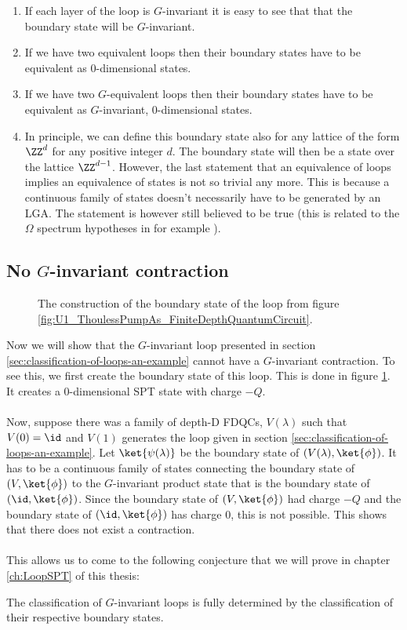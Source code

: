 \begin{enumerate}
	\item If each layer of the loop is $G$-invariant it is easy to see that that the boundary state will be $G$-invariant.
	\item If we have two equivalent loops then their boundary states have to be equivalent as 0-dimensional states.
	\item If we have two $G$-equivalent loops then their boundary states have to be equivalent as $G$-invariant, 0-dimensional states.
	\item In principle, we can define this boundary state also for any lattice of the form $\ZZ^d$ for any positive integer $d$. The boundary state will then be a state over the lattice $\ZZ^{d-1}$. However, the last statement that an equivalence of loops implies an equivalence of states is not so trivial any more. This is because a continuous family of states doesn't necessarily have to be generated by an LGA. The statement is however still believed to be true (this is related to the $\Omega$ spectrum hypotheses in for example \cite{xiong2019classification}).
\end{enumerate}

\subsection{No $G$-invariant contraction}
\begin{figure}
	\centering
	\scalebox{0.75}{
		
	}
	\caption{The construction of the boundary state of the loop from figure \ref{fig:U1_ThoulessPumpAs_FiniteDepthQuantumCircuit}.}
	\label{fig:U1_ThoulessPumpAs_FiniteDepthQuantumCircuit_Boundary}
\end{figure}
Now we will show that the $G$-invariant loop presented in section \ref{sec:classification-of-loops-an-example} cannot have a $G$-invariant contraction. To see this, we first create the boundary state of this loop. This is done in figure \ref{fig:U1_ThoulessPumpAs_FiniteDepthQuantumCircuit_Boundary}. It creates a 0-dimensional SPT state with charge $-Q$.\\\\
Now, suppose there was a family of depth-D FDQCs, $V(\lambda)$ such that $V(0)=\id$ and $V(1)$ generates the loop given in section \ref{sec:classification-of-loops-an-example}. Let $\ket{\psi(\lambda)}$ be the boundary state of $(V(\lambda),\ket{\phi})$. It has to be a continuous family of states connecting the boundary state of $(V,\ket{\phi})$ to the $G$-invariant product state that is the boundary state of $(\id,\ket{\phi})$. Since the boundary state of $(V,\ket{\phi})$ had charge $-Q$ and the boundary state of $(\id,\ket{\phi})$ has charge $0$, this is not possible. This shows that there does not exist a contraction.\\\\
This allows us to come to the following conjecture that we will prove in chapter \ref{ch:LoopSPT} of this thesis:
\begin{conjecture}
	The classification of $G$-invariant loops is fully determined by the classification of their respective boundary states.
\end{conjecture}
